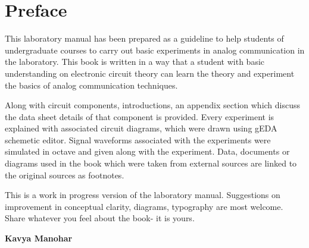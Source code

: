 \chapter*{Preface} 

This laboratory manual has been prepared as a guideline to help students of undergraduate courses to carry out basic experiments in analog communication in the laboratory. This book is written in a way that a student with basic understanding on electronic circuit theory can learn the theory and experiment the basics of analog communication techniques.

Along with circuit components, introductions, an appendix section which discuss the data sheet details of that component is provided. Every experiment is explained with associated circuit diagrams, which were drawn using gEDA schemetic editor. Signal waveforms associated with the experiments were simulated in octave and given along with the experiment. Data, documents or diagrams used in the 
book which were taken from external sources are linked to the original sources as footnotes.

This is a work in progress version of the laboratory manual. Suggestions on improvement in conceptual clarity, diagrams, typography are most welcome. Share whatever you feel about the book- it is yours.

\begin{flushright}
\textbf{Kavya Manohar}
\end{flushright}